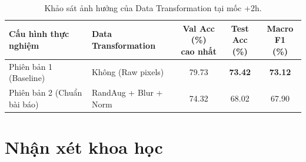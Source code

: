 \documentclass[12pt, a4paper]{article}
\begin{document}
\begin{table}[htbp]
    \centering
    \small
    \caption{Khảo sát ảnh hưởng của Data Transformation tại mốc +2h.}
    \label{tab:ablation}
    \setlength{\tabcolsep}{4pt}
    \begin{tabularx}{\textwidth}{@{}*{2}{>{\raggedright\arraybackslash}X}*{3}{c}@{}}
        \hline
        \textbf{Cấu hình thực nghiệm} & \textbf{Data Transformation} & \makecell{\textbf{Val Acc (\%)}\\\textbf{cao nhất}} & \makecell{\textbf{Test Acc}\\\textbf{(\%)}} & \makecell{\textbf{Macro F1}\\\textbf{(\%)}} \\
        \hline
        Phiên bản 1 (Baseline) & Không (Raw pixels) & 79.73 & \textbf{73.42} & \textbf{73.12} \\
        Phiên bản 2 (Chuẩn bài báo) & RandAug + Blur + Norm & 74.32 & 68.02 & 67.90 \\
        \hline
    \end{tabularx}
\end{table}

\section{Nhận xét khoa học}
\end{document}
